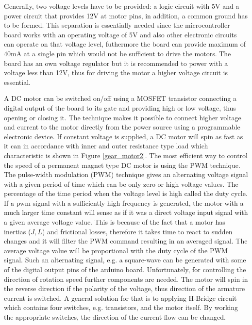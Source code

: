 \documentclass[12pt,english,twoside]{article}
\begin{document}
Generally, two voltage levels have to be provided: a logic circuit with 5V and a power circuit that provides 12V at motor pins, in addition, a common ground has to be formed. This separation is essentially needed since the microcontroller board works with an operating voltage of 5V and also other electronic circuits can operate on that voltage level, futhermore the board can provide maximum of 40mA at a single pin which would not be sufficient to drive the motors. The board has an own voltage regulator but it is recommended to power with a voltage less than 12V, thus for driving the motor a higher voltage circuit is essential. \cite{arduino} 

A DC motor can be switched on/off using a MOSFET transistor connecting a digital output of the board to its gate and providing high or low voltage, thus opening or closing it. The technique makes it possible to connect higher voltage and current to the motor directly from the power source using a programmable electronic device. If constant voltage is supplied, a DC motor will spin as fast as it can in accordance with inner and outer resistance type load which characteristic is shown in Figure \ref{gear_motor2}. The most efficient way to control the speed of a permanent magnet type DC motor is using the PWM technique. The pulse-width modulation (PWM) technique gives an alternating voltage signal with a given period of time which can be only zero or high voltage values. The percentage of the time period when the voltage level is high called the duty cycle. If a pwm signal with a sufficiently high frequency is generated, the motor with a much larger time constant will sense as if it was a direct voltage input signal with a given average voltage value. This is because of the fact that a motor has inertias ($J,L$) and frictional losses, therefore it takes time to react to sudden changes and it will filter the PWM command resulting in an averaged signal. \cite{dc_motor_3} \cite{dc_motor_4} The average voltage value will be proportional with the duty cycle of the PWM signal. Such an alternating signal, e.g. a square-wave can be generated with some of the digital output pins of the arduino board. Unfortunately, for controlling the direction of rotation speed further components are needed. The motor will spin in the reverse direction if the polarity of the voltage, thus direction of the armature current is switched. A general solution for that is to applying H-Bridge circuit which contains four switches, e.g. transistors, and the motor itself. By working the appropriate switches, the direction of the current flow can be changed. \cite{howtomech}
\end{document}
